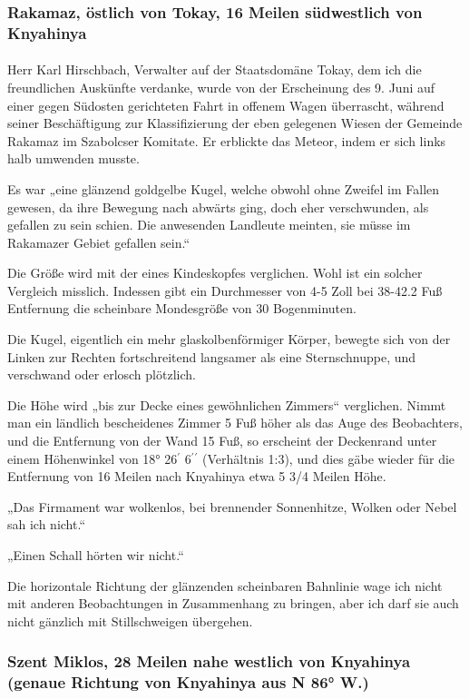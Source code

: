 \documentclass[a4paper, 11pt, oneside, german]{article}
\begin{document}
\subsubsection{Rakamaz, östlich von Tokay, 16 Meilen südwestlich von Knyahinya}
\paragraph{}
Herr Karl Hirschbach, Verwalter auf der Staatsdomäne Tokay, dem ich die freundlichen Auskünfte verdanke, wurde von der Erscheinung des 9. Juni auf einer gegen Südosten gerichteten Fahrt in offenem Wagen überrascht, während seiner Beschäftigung zur Klassifizierung der eben gelegenen Wiesen der Gemeinde Rakamaz im Szabolcser Komitate. Er erblickte das Meteor, indem er sich links halb umwenden musste.

Es war „eine glänzend goldgelbe Kugel, welche obwohl ohne Zweifel im Fallen gewesen, da ihre Bewegung nach abwärts ging, doch eher verschwunden, als gefallen zu sein schien. Die anwesenden Landleute meinten, sie müsse im Rakamazer Gebiet gefallen sein.“

Die Größe wird mit der eines Kindeskopfes verglichen. Wohl ist ein solcher Vergleich misslich. Indessen gibt ein Durchmesser von 4-5 Zoll bei 38-42.2 Fuß Entfernung die scheinbare Mondesgröße von 30 Bogenminuten.

Die Kugel, eigentlich ein mehr glaskolbenförmiger Körper, bewegte sich von der Linken zur Rechten fortschreitend langsamer als eine Sternschnuppe, und verschwand oder erlosch plötzlich.

Die Höhe wird „bis zur Decke eines gewöhnlichen Zimmers“ verglichen. Nimmt man ein ländlich bescheidenes Zimmer 5 Fuß höher als das Auge des Beobachters, und die Entfernung von der Wand 15 Fuß, so erscheint der Deckenrand unter einem Höhenwinkel von 18° 26$^{\prime}$ 6$^{\prime}$$^{\prime}$ (Verhältnis 1:3), und dies gäbe wieder für die Entfernung von 16 Meilen nach Knyahinya etwa 5 3/4 Meilen Höhe.

„Das Firmament war wolkenlos, bei brennender Sonnenhitze, Wolken oder Nebel sah ich nicht.“

„Einen Schall hörten wir nicht.“

Die horizontale Richtung der glänzenden scheinbaren Bahnlinie wage ich nicht mit anderen Beobachtungen in Zusammenhang zu bringen, aber ich darf sie auch nicht gänzlich mit Stillschweigen übergehen.
\clearpage
\subsubsection{Szent Miklos, 28 Meilen nahe westlich von Knyahinya (genaue Richtung von Knyahinya aus N 86° W.)}
\end{document}
